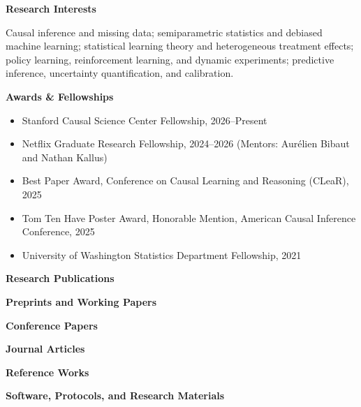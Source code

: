 \documentclass[10pt,letterpaper]{article}
\newcommand{\cvsection}[1]{%
  \vspace{0.55em}%
  {\Large\bfseries #1}\par
  \vspace{0.20em}%
}
\newcommand{\cvsubsection}[1]{%
  \vspace{0.35em}%
  {\large\bfseries #1}\par
  \vspace{0.12em}%
}
\begin{document}
\cvsection{Research Interests}
Causal inference and missing data; semiparametric statistics and debiased machine learning; statistical learning theory and heterogeneous treatment effects; policy learning, reinforcement learning, and dynamic experiments; predictive inference, uncertainty quantification, and calibration.

\cvsection{Awards \& Fellowships}
\begin{itemize}
  \item Stanford Causal Science Center Fellowship, 2026--Present
  \item Netflix Graduate Research Fellowship, 2024--2026 (Mentors: Aur\'elien Bibaut and Nathan Kallus)
  \item Best Paper Award, Conference on Causal Learning and Reasoning (CLeaR), 2025
  \item Tom Ten Have Poster Award, Honorable Mention, American Causal Inference Conference, 2025
  \item University of Washington Statistics Department Fellowship, 2021
\end{itemize}

\cvsection{Research Publications}
{\small
\cvsubsection{Preprints and Working Papers}
\printbibliography[category=preprints,heading=none]

\cvsubsection{Conference Papers}
\printbibliography[category=conference,heading=none]

\cvsubsection{Journal Articles}
\printbibliography[category=journal,heading=none]

\cvsubsection{Reference Works}
\printbibliography[category=reference,heading=none]

\cvsubsection{Software, Protocols, and Research Materials}
\printbibliography[category=outputs,heading=none]
}
\end{document}
